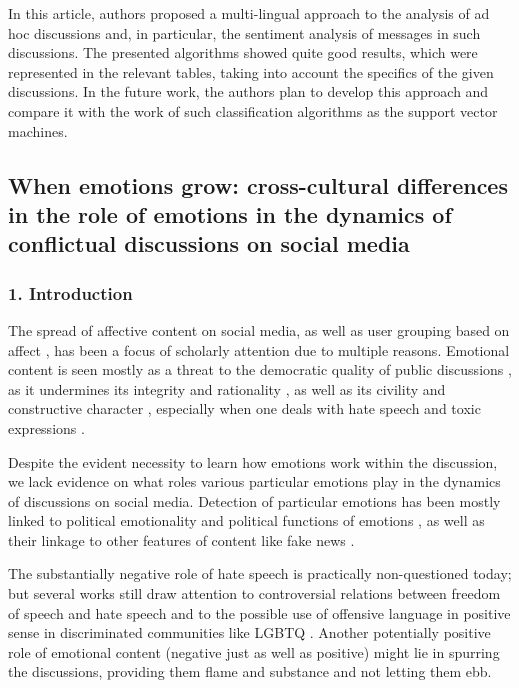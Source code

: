 In this article, authors proposed a multi-lingual approach to the analysis of ad hoc discussions and, in particular, the sentiment analysis of messages in such discussions. The presented algorithms showed quite good results, which were represented in the relevant tables, taking into account the specifics of the given discussions. In the future work, the authors plan to develop this approach and compare it with the work of such classification algorithms as the support vector machines.

\subsection{When emotions grow: cross-cultural differences in the role of emotions in the dynamics of conflictual discussions on social media}\label{subsec:ch5/sec3/sub2}

\subsubsection{1. Introduction}

The spread of affective content on social media, as well as user grouping based on affect \cite{Papacharissi}, has been a focus of scholarly attention due to multiple reasons. Emotional content is seen mostly as a threat to the democratic quality of public discussions \cite{Cortese}, as it undermines its integrity and rationality \cite{BadjatiyaGuptaGupta}, as well as its civility and constructive character \cite{BurnapWilliams}, especially when one deals with hate speech and toxic expressions \cite{ParkFung,GeorgakopoulosTasoulisVrahatis}.

Despite the evident necessity to learn how emotions work within the discussion, we lack evidence on what roles various particular emotions play in the dynamics of discussions on social media. Detection of particular emotions has been mostly linked to political emotionality and political functions of emotions \cite{Lyman,TicentoCloughHalley,HeaneyFlam,WahlJorgensen}, as well as their linkage to other features of content like fake news \cite{VosoughiRoyAral}.

The substantially negative role of hate speech is practically non-questioned today; but several works still draw attention to controversial relations between freedom of speech and hate speech \cite{Dorsett,Cammaerts} and to the possible use of offensive language in positive sense in discriminated communities like LGBTQ \cite{WaseemDavidsonWarmsley}. Another potentially positive role of emotional content (negative just as well as positive) might lie in spurring the discussions, providing them flame and substance and not letting them ebb.

